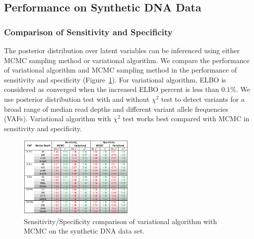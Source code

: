 \documentclass{article}
\begin{document}
\subsection{Performance on Synthetic DNA Data}
\subsubsection{Comparison of Sensitivity and Specificity}
The posterior distribution over latent variables can be inferenced using either MCMC sampling method or variational algorithm.
We compare the performance of variational algorithm and MCMC sampling method in the performance of sensitivity and specificity (Figure~\ref{tbl:statistics_mcmc_var}).
For variational algorithm, ELBO is considered as converged when the increased ELBO percent is less than $0.1\%$.
We use posterior distribution test with and without $\chi^2$ test to detect variants for a broad range of median read depths and different variant allele frequencies (VAFs).
Variational algorithm with $\chi^2$ test works best compared with MCMC in sensitivity and specificity.


\begin{figure}[h]
\centering
\vspace{-5pt}
\includegraphics[width=0.5\textwidth]{figs/statistics_mcmc_var.png}
\caption{Sensitivity/Specificity comparison of variational algorithm with MCMC on the synthetic DNA data set.}
\vspace{-10pt}
\label{tbl:statistics_mcmc_var}
\end{figure}
\end{document}
